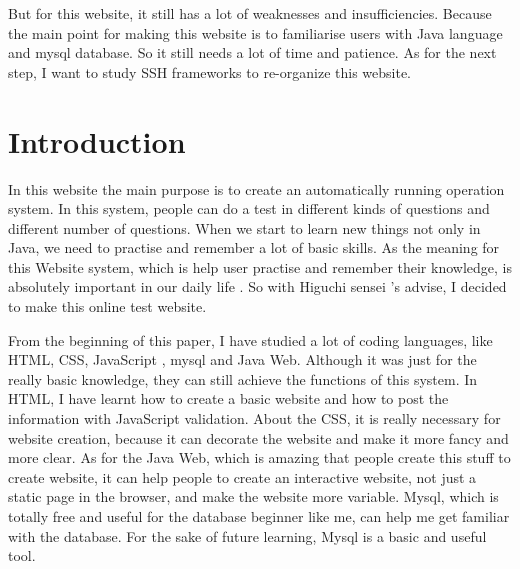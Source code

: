 \documentclass[12pt]{article}
\begin{document}
   But for this website, it still has a lot of weaknesses and insufficiencies. Because the main point for making this website is to familiarise users with Java language and mysql database. So it still needs a lot of time and patience. As for the next step, I want to study SSH frameworks to re-organize this website.  
   
   
     
     
\cleardoublepage


\tableofcontents
\thispagestyle{empty}
\cleardoublepage 

\listoffigures
{}
\cleardoublepage


\setcounter{page}{1}



\section{Introduction}\label{sec:intro}
	In this website the main purpose is to create an automatically running operation system. In this system, people can do a test in  different kinds of questions and different number of questions. When we start to learn new things not only in Java, we need to practise and remember a lot of basic skills. As the meaning for this Website system, which is help user practise and remember their knowledge, is absolutely important in our daily life . So with Higuchi sensei 's advise, I decided to make this online test website.
	
	From the beginning of this paper, I have studied a lot of coding languages, like HTML, CSS, JavaScript , mysql and Java Web. Although it was just for the really basic knowledge, they can still achieve the functions of this system. In HTML, I have learnt how to create a basic website and how to post the information with JavaScript validation. About the CSS, it is really necessary for website creation, because it can decorate the website and make it more fancy and more clear. As for the Java Web, which is amazing that people create this stuff to create website, it can help people to create an interactive website, not just a static page in the browser, and make the website more variable.  Mysql, which is totally free and useful for the database beginner like me, can help me get familiar with the database. For the sake of future learning, Mysql is a basic and useful tool.
	
\end{document}
